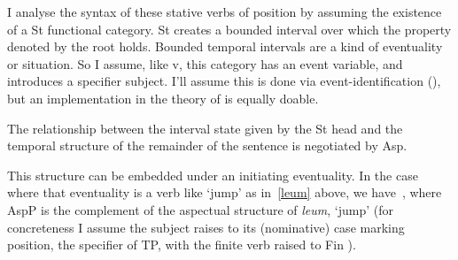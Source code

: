 \documentclass[output=paper]{langsci/langscibook}
\begin{document}
I analyse the syntax of these stative verbs of position by assuming the existence of a St
functional category. St creates a bounded interval over which the property
denoted by the root holds. Bounded temporal intervals are a kind of eventuality
or situation. So I assume, like v, this category has an event variable, and
introduces a specifier subject. I'll assume this is done via
event-identification (\citealt{kratzer96}), but an implementation in the
theory of \citet{ramchand08} is equally doable.

The relationship between the interval state given by the St head and the
temporal structure of the remainder of the sentence is negotiated by Asp.

\ea
{}
\z
This structure can be embedded under an initiating eventuality. In the case
where that eventuality is a verb like `jump' as in~\eqref{leum} above, we
have~, where AspP is the complement of the aspectual structure of
\emph{leum}, `jump' (for concreteness I assume the subject raises to its
(nominative) case marking position, the specifier of TP,
with the finite verb raised to Fin \citealt{adger:07}).
\end{document}
